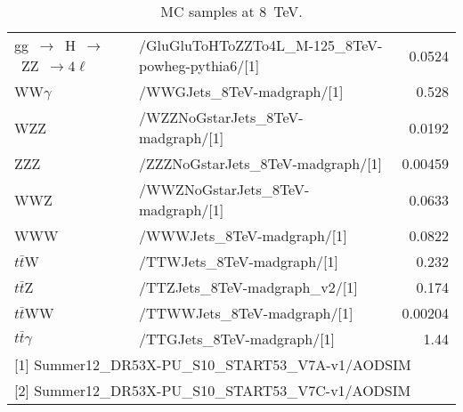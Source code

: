 \documentclass[a4paper]{jpconf}
\begin{document}
\begin{landscape}
\begin{table}[ht]
\begin{small}
\begin{center}
\begin{tabular}{l|l|r}
 gg~$\to$~H~$\to$~ZZ~$\to 4\ell$                      & /GluGluToHToZZTo4L\_M-125\_8TeV-powheg-pythia6/[1]                     &  0.0524\\
 WW$\gamma$                                           & /WWGJets\_8TeV-madgraph/[1]                                            &   0.528\\
 WZZ                                                  & /WZZNoGstarJets\_8TeV-madgraph/[1]                                     &  0.0192\\
 ZZZ                                                  & /ZZZNoGstarJets\_8TeV-madgraph/[1]                                     & 0.00459\\
 WWZ                                                  & /WWZNoGstarJets\_8TeV-madgraph/[1]                                     &  0.0633\\
 WWW                                                  & /WWWJets\_8TeV-madgraph/[1]                                            &  0.0822\\
 $t\bar{t}$W                                          & /TTWJets\_8TeV-madgraph/[1]                                            &   0.232\\
 $t\bar{t}$Z                                          & /TTZJets\_8TeV-madgraph\_v2/[1]                                        &   0.174\\
 $t\bar{t}$WW                                         & /TTWWJets\_8TeV-madgraph/[1]                                           & 0.00204\\
 $t\bar{t}\gamma$                                     & /TTGJets\_8TeV-madgraph/[1]                                            &    1.44\\
\hline
\multicolumn{3}{l}{[1] Summer12\_DR53X-PU\_S10\_START53\_V7A-v1/AODSIM}\\
\multicolumn{3}{l}{[2] Summer12\_DR53X-PU\_S10\_START53\_V7C-v1/AODSIM}\\
\hline
\end{tabular}
\caption{MC samples at 8~TeV.}
\label{tab:mc_samples}
\end{center}
\end{small}
\end{table}


\end{landscape}
\end{document}
